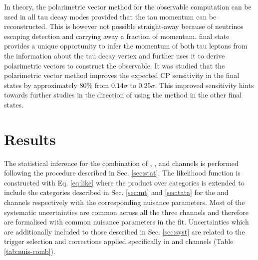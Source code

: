 In theory, the polarimetric vector method for the \phicp observable computation can be used in all tau decay modes provided that the tau momentum can be reconstructed. This is however not possible straight-away because of neutrinos escaping detection and carrying away a fraction of momentum. \aaa final state provides a unique opportunity to infer the momentum of both tau leptons from the information about the tau decay vertex and further uses it to derive polarimetric vectors to construct the \phicp observable. It was studied that the polarimetric vector method improves the expected CP sensitivity in the \aaa final states by approximately 80\% from $0.14\sigma$ to $0.25\sigma$. This improved sensitivity hints towards further studies in the direction of using the method in the other final states.

\section{Results}\label{sec:comb_res}

The statistical inference for the combination of \et, \mt, and \tata channels is performed following the procedure described in Sec. \ref{sec:stat}. The likelihood function is constructed with Eq. \ref{eq:like} where the product over categories is extended to include the categories described in Sec. \ref{sec:mt} and \ref{sec:tata} for the \mt and \tata channels respectively with the corresponding nuisance parameters. Most of the systematic uncertainties are common across all the three channels and therefore are formalised with common nuisance parameters in the fit. Uncertainties which are additionally included to those described in Sec. \ref{sec:syst} are related to the trigger selection and corrections applied specifically in \mt and \tata channels (Table \ref{tab:nuis-comb}).


